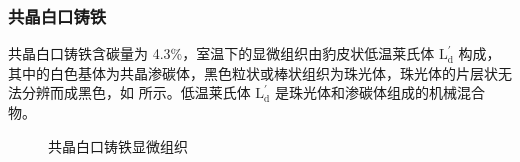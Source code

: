 \documentclass[a4paper,utf8]{article}
\begin{document}
    \subsubsection{共晶白口铸铁}
    共晶白口铸铁含碳量为 4.3\%，室温下的显微组织由豹皮状低温莱氏体 $\text{L}_\text{d}^{'}$ 构成，其中的白色基体为共晶渗碳体，黑色粒状或棒状组织为珠光体，珠光体的片层状无法分辨而成黑色，如 所示。低温莱氏体 $\text{L}_\text{d}^{'}$ 是珠光体和渗碳体组成的机械混合物。
    \begin{figure}[!ht]
        \hspace{20pt}
        \hspace{20pt}
        \caption{共晶白口铸铁显微组织\label{fig:n6}}
    \end{figure}
\end{document}
